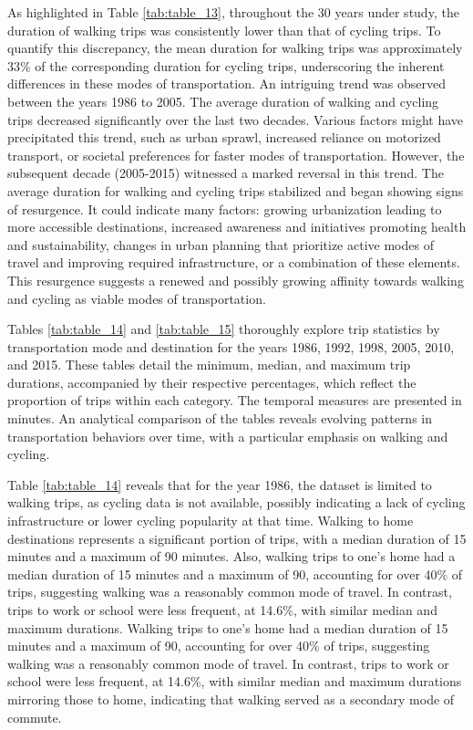 \documentclass[
11pt, %
oneside, %
english, %
singlespacing, %
]{macthesis} %
\begin{document}
As highlighted in Table \ref{tab:table_13}, throughout the 30 years under study, the duration of walking trips was consistently lower than that of cycling trips. To quantify this discrepancy, the mean duration for walking trips was approximately 33\% of the corresponding duration for cycling trips, underscoring the inherent differences in these modes of transportation. An intriguing trend was observed between the years 1986 to 2005. The average duration of walking and cycling trips decreased significantly over the last two decades. Various factors might have precipitated this trend, such as urban sprawl, increased reliance on motorized transport, or societal preferences for faster modes of transportation. However, the subsequent decade (2005-2015) witnessed a marked reversal in this trend. The average duration for walking and cycling trips stabilized and began showing signs of resurgence. It could indicate many factors: growing urbanization leading to more accessible destinations, increased awareness and initiatives promoting health and sustainability, changes in urban planning that prioritize active modes of travel and improving required infrastructure, or a combination of these elements. This resurgence suggests a renewed and possibly growing affinity towards walking and cycling as viable modes of transportation.

Tables \ref{tab:table_14} and \ref{tab:table_15} thoroughly explore trip statistics by transportation mode and destination for the years 1986, 1992, 1998, 2005, 2010, and 2015. These tables detail the minimum, median, and maximum trip durations, accompanied by their respective percentages, which reflect the proportion of trips within each category. The temporal measures are presented in minutes. An analytical comparison of the tables reveals evolving patterns in transportation behaviors over time, with a particular emphasis on walking and cycling.

Table \ref{tab:table_14} reveals that for the year 1986, the dataset is limited to walking trips, as cycling data is not available, possibly indicating a lack of cycling infrastructure or lower cycling popularity at that time. Walking to home destinations represents a significant portion of trips, with a median duration of 15 minutes and a maximum of 90 minutes. Also, walking trips to one's home had a median duration of 15 minutes and a maximum of 90, accounting for over 40\% of trips, suggesting walking was a reasonably common mode of travel. In contrast, trips to work or school were less frequent, at 14.6\%, with similar median and maximum durations. Walking trips to one's home had a median duration of 15 minutes and a maximum of 90, accounting for over 40\% of trips, suggesting walking was a reasonably common mode of travel. In contrast, trips to work or school were less frequent, at 14.6\%, with similar median and maximum durations mirroring those to home, indicating that walking served as a secondary mode of commute.
\end{document}
